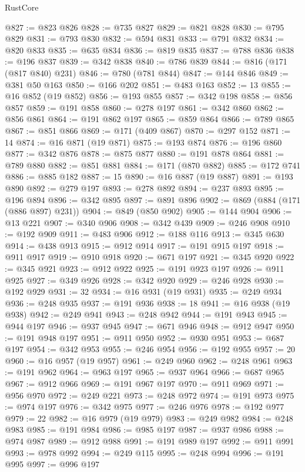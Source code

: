 \begin{lexlean}{RustCore}
\begin{coremodule}
@827 := @823 @826
@828 := @735 @827
@829 := @821 @828
@830 := @795 @829
@831 := @793 @830
@832 := @594 @831
@833 := @791 @832
@834 := @820 @833
@835 := @635 @834
@836 := @819 @835
@837 := @788 @836
@838 := @196 @837
@839 := @342 @838
@840 := @786 @839
@844 := @816 (@171 (@817 @840) @231)
@846 := @780 (@781 @844)
@847 := @144 @846
@849 := @381 @50 @163
@850 := @166 @202
@851 := @483 @163
@852 := 13
@855 := @16 @852 (@19 @852)
@856 := @193 @855
@857 := @342 @198
@858 := @856 @857
@859 := @191 @858
@860 := @278 @197
@861 := @342 @860
@862 := @856 @861
@864 := @191 @862 @197
@865 := @859 @864
@866 := @789 @865
@867 := @851 @866
@869 := @171 (@409 @867)
@870 := @297 @152
@871 := 14
@874 := @16 @871 (@19 @871)
@875 := @193 @874
@876 := @196 @860
@877 := @342 @876
@878 := @875 @877
@880 := @191 @878 @864
@881 := @789 @880
@882 := @851 @881
@884 := @171 (@870 @882)
@885 := @172 @741
@886 := @885 @182
@887 := 15
@890 := @16 @887 (@19 @887)
@891 := @193 @890
@892 := @279 @197
@893 := @278 @892
@894 := @237 @893
@895 := @196 @894
@896 := @342 @895
@897 := @891 @896
@902 := @869 (@884 (@171 (@886 @897) @231))
@904 := @849 (@850 @902)
@905 := @144 @904
@906 := @13 @221
@907 := @340 @906
@908 := @342 @439
@909 := @246 @908
@910 := @192 @909
@911 := @483 @906
@912 := @188 @116
@913 := @345 @630
@914 := @438 @913
@915 := @912 @914
@917 := @191 @915 @197
@918 := @911 @917
@919 := @910 @918
@920 := @671 @197
@921 := @345 @920
@922 := @345 @921
@923 := @912 @922
@925 := @191 @923 @197
@926 := @911 @925
@927 := @349 @926
@928 := @342 @920
@929 := @246 @928
@930 := @192 @929
@931 := 32
@934 := @16 @931 (@19 @931)
@935 := @249 @934
@936 := @248 @935
@937 := @191 @936
@938 := 18
@941 := @16 @938 (@19 @938)
@942 := @249 @941
@943 := @248 @942
@944 := @191 @943
@945 := @944 @197
@946 := @937 @945
@947 := @671 @946
@948 := @912 @947
@950 := @191 @948 @197
@951 := @911 @950
@952 := @930 @951
@953 := @687 @197
@954 := @342 @953
@955 := @246 @954
@956 := @192 @955
@957 := 20
@960 := @16 @957 (@19 @957)
@961 := @249 @960
@962 := @248 @961
@963 := @191 @962
@964 := @963 @197
@965 := @937 @964
@966 := @687 @965
@967 := @912 @966
@969 := @191 @967 @197
@970 := @911 @969
@971 := @956 @970
@972 := @249 @221
@973 := @248 @972
@974 := @191 @973
@975 := @974 @197
@976 := @342 @975
@977 := @246 @976
@978 := @192 @977
@979 := 22
@982 := @16 @979 (@19 @979)
@983 := @249 @982
@984 := @248 @983
@985 := @191 @984
@986 := @985 @197
@987 := @937 @986
@988 := @974 @987
@989 := @912 @988
@991 := @191 @989 @197
@992 := @911 @991
@993 := @978 @992
@994 := @249 @115
@995 := @248 @994
@996 := @191 @995
@997 := @996 @197

\end{coremodule}
\end{lexlean}
